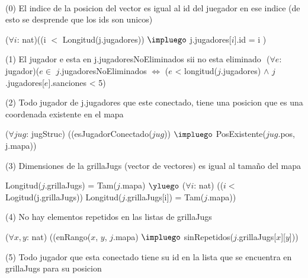 \begin{Representacion}
$ $\newline
$ $\newline


$ $\newline

(0) El indice de la posicion del vector es igual al id del juegador en ese indice (de esto se desprende que los ids son unicos) $ $\newline

($\forall i$: nat)((i $<$ Longitud(j.jugadores)) $\impluego$ j.jugadores[$i$].id = i )
$ $\newline


(1) El jugador e esta en j.jugadoresNoEliminados sii no esta eliminado $ $\newline
($\forall e$: jugador)($e \in$ $j$.jugadoresNoEliminados $\iff$ ($e$ < longitud($j$.jugadores) $\land$ $j$.jugadores[$e$].sanciones < 5)
$ $\newline

(2) Todo jugador de j.jugadores que este conectado, tiene una posicion que es una coordenada existente en el mapa $ $\newline

($\forall jug$: jugStruc) ((esJugadorConectado($jug$)) $\impluego$ PosExistente($jug$.pos, j.mapa))
$ $\newline


(3) Dimensiones de la grillaJugs (vector de vectores) es igual al tama\~no del mapa $ $\newline

Longitud($j$.grillaJugs) = Tam($j$.mapa) $\yluego$ 
($\forall i$: nat) (($i <$ Logitud(j.grillaJugs)) Longitud($j$.grillaJugs[i]) = Tam($j$.mapa)) 
$ $\newline


(4) No hay elementos repetidos en las listas de grillaJugs  $ $\newline

($\forall x, y$: nat) ((enRango($x$, $y$, $j$.mapa) $\impluego$ sinRepetidos($j$.grillaJugs[$x$][$y$]))
$ $\newline

(5) Todo jugador que esta conectado tiene su id en la lista que se encuentra en grillaJugs para su posicion  $ $\newline



\end{Representacion}
